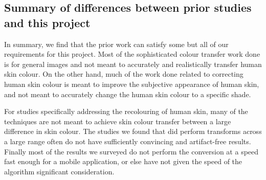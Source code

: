 \subsection{Summary of differences between prior studies and this project}

In summary, we find that the prior work can satisfy some but all of our requirements for this project. Most of the sophisticated colour transfer work done is for general images and not meant to accurately and realistically transfer human skin colour. On the other hand, much of the work done related to correcting human skin colour is meant to improve the subjective appearance of human skin, and not meant to accurately change the human skin colour to a specific shade. 

For studies specifically addressing the recolouring of human skin, many of the techniques are not meant to achieve skin colour transfer between a large difference in skin colour. The studies we found that did perform transforms across a large range often do not have sufficiently convincing and artifact-free results. Finally most of the results we surveyed do not perform the conversion at a speed fast enough for a mobile application, or else have not given the speed of the algorithm significant consideration.
